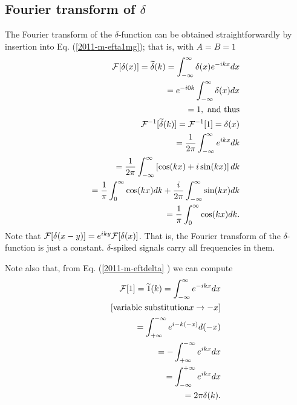 \subsection{Fourier transform  of $\delta$}
The Fourier transform of the $\delta$-function can be obtained straightforwardly
by insertion into Eq. (\ref{2011-m-efta1mg}); that is,
with $A=B=1$
\begin{equation}
\begin{split}
  {\cal F}[\delta (x)]=\widetilde{\delta}(k)=   \int_{-\infty}^\infty  \delta(x) e^{-i{kx}} dx   \\
\qquad =    e^{-i{0k}}  \int_{-\infty}^\infty  \delta(x)  dx   \\
\qquad =    1, \textrm{ and thus}
\\
 {\cal F}^{-1}[\widetilde{\delta} (k)]=
 {\cal F}^{-1}[1]=\delta (x)  \\
\qquad = \frac{1}{2\pi}  \int_{-\infty}^\infty    e^{i{kx}} dk\\
\qquad =
\frac{1}{2\pi}  \int_{-\infty}^\infty  \left[  \cos(kx)+ i \sin(kx) \right] dk\\
\qquad =
\frac{1}{ \pi}  \int_{0}^\infty    \cos(kx) dk   +
\frac{ i }{2\pi}  \int_{-\infty}^\infty   \sin(kx)   dk\\
\qquad =
\frac{1}{ \pi}  \int_{0}^\infty    \cos(kx) dk
.
\end{split}
\label{2011-m-eftdelta}
\end{equation}
Note that  ${\cal F}[\delta (x-y)]=e^{i{ky}}{\cal F}[\delta (x)]$.
That is, the Fourier transform of the $\delta$-function is just a constant.
$\delta$-spiked signals carry all frequencies in them.

Note also that, from Eq. (\ref{2011-m-eftdelta} ) we can compute
\begin{equation}
\begin{split}
{\cal F}[1]=\widetilde{1}(k)=   \int_{-\infty}^\infty    e^{-i{kx}} dx   \\
\qquad [\textrm{variable substitution} x \rightarrow -x]\\
\qquad =   \int_{+\infty}^{-\infty}    e^{i{-k(-x)}} d(-x)   \\
\qquad =  - \int_{+\infty}^{-\infty}    e^{i{kx}} dx   \\
\qquad =    \int_{-\infty}^{+\infty}    e^{i{kx}} dx   \\
\qquad =    2\pi \delta (k)
.
\end{split}
\label{2011-m-eftdelta1}
\end{equation}


